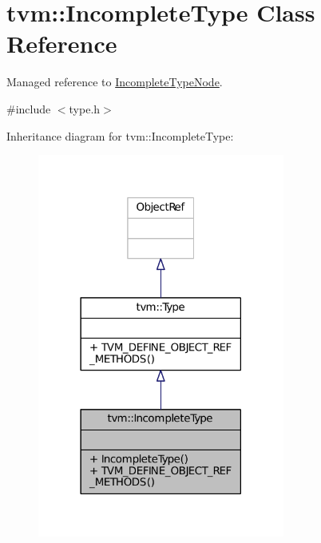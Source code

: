 \hypertarget{classtvm_1_1IncompleteType}{}\section{tvm\+:\+:Incomplete\+Type Class Reference}
\label{classtvm_1_1IncompleteType}


Managed reference to \hyperlink{classtvm_1_1IncompleteTypeNode}{Incomplete\+Type\+Node}.  




{\ttfamily \#include $<$type.\+h$>$}



Inheritance diagram for tvm\+:\+:Incomplete\+Type\+:
\nopagebreak
\begin{figure}[H]
\begin{center}
\leavevmode
\includegraphics[width=230pt]{classtvm_1_1IncompleteType__inherit__graph}
\end{center}
\end{figure}


